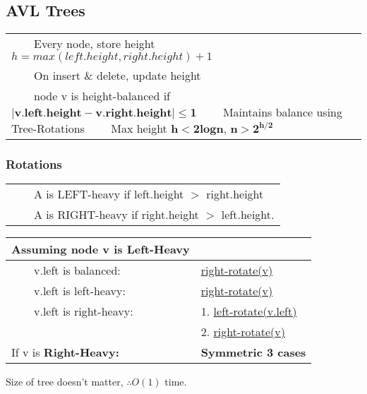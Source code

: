 \documentclass{article}
\newcommand{\tabitem}{~~\llap{\textbullet}~~}
\begin{document}
    \pagebreak

    \subsection{AVL Trees}

    \begin{tabular}{l}
        \tabitem Every node, store height $h = max(left.height, right.height) + 1$ \\
        \tabitem On insert \& delete, update height\\
        \tabitem node v is height-balanced if $\bm{|v.left.height - v.right.height| \leq 1}$
        \tabitem Maintains balance using Tree-Rotations
        \tabitem Max height $\bm{h < 2logn}$, $\bm{n > 2^{h/2}}$
    \end{tabular}

    \subsubsection{Rotations}

    \begin{tabular}{l}
        \tabitem A is LEFT-heavy if left.height $>$ right.height\\
        \tabitem A is RIGHT-heavy if right.height $>$ left.height.\\
    \end{tabular}

    \bigskip

    \noindent\begin{tabular}{ll}
        \toprule
        \textbf{Assuming node v is Left-Heavy}\\
        \hline
        \hline
        \tabitem v.left is balanced: & \hyperref[rightrot]{right-rotate(v)}\\
        \hline
        \tabitem v.left is left-heavy: & \hyperref[rightrot2]{right-rotate(v)}\\
        \hline
        \tabitem v.left is right-heavy: & 1. \hyperref[case31]{left-rotate(v.left)}\\
        & 2. \hyperref[case32]{right-rotate(v)}\\
        \bottomrule
        If v is \textbf{Right-Heavy: } & \textbf{Symmetric 3 cases}\\
        \bottomrule
    \end{tabular}

    \bigskip

    Size of tree doesn't matter, $\therefore O(1)$ time.
    
\end{document}
